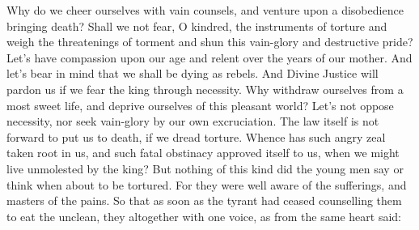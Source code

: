 {Why do we cheer ourselves with vain counsels, and venture upon a disobedience bringing death?
Shall we not fear, O kindred, the instruments of torture and weigh the threatenings of torment and shun this vain-glory and destructive pride?
Let’s have compassion upon our age and relent over the years of our mother.
And let’s bear in mind that we shall be dying as rebels.
And Divine Justice will pardon us if we fear the king through necessity.
Why withdraw ourselves from a most sweet life, and deprive ourselves of this pleasant world?
Let’s not oppose necessity, nor seek vain-glory by our own excruciation.
The law itself is not forward to put us to death, if we dread torture.
Whence has such angry zeal taken root in us, and such fatal obstinacy approved itself to us, when we might live unmolested by the king?
But nothing of this kind did the young men say or think when about to be tortured.
For they were well aware of the sufferings, and masters of the pains.
So that as soon as the tyrant had ceased counselling them to eat the unclean, they altogether with one voice, as from the same heart said:

}
